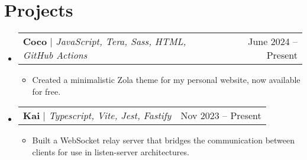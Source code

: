 \documentclass[letterpaper,11pt]{article}
\makeatletter
\newcommand{\resumeItem}[1]{
  \item\small{#1}
}
\newcommand{\resumeProjectHeading}[2]{
    \item
    \begin{tabular*}{0.97\textwidth}{l@{\extracolsep{\fill}}r}
      \small#1 & #2 \\
    \end{tabular*}\vspace{-7pt}
}
\newcommand{\resumeSubHeadingListStart}{\begin{itemize}[leftmargin=0.15in, label={}]}
\newcommand{\resumeSubHeadingListEnd}{\end{itemize}}
\newcommand{\resumeItemListStart}{\begin{itemize}}
\newcommand{\resumeItemListEnd}{\end{itemize}}
\makeatother
\begin{document}
\section{Projects}
    \resumeSubHeadingListStart
      \resumeProjectHeading
          {\textbf{Coco} $|$ \emph{JavaScript, Tera, Sass, HTML, GitHub Actions}}{June 2024 -- Present}
          \resumeItemListStart
            \resumeItem{Created a minimalistic Zola theme for my personal website, now available for free.}
          \resumeItemListEnd
      \resumeProjectHeading
          {\textbf{Kai} $|$ \emph{Typescript, Vite, Jest, Fastify }}{Nov 2023 -- Present}
          \resumeItemListStart
            \resumeItem{Built a WebSocket relay server that bridges the communication between clients for use in listen-server architectures.}
          \resumeItemListEnd
    \resumeSubHeadingListEnd
\end{document}
